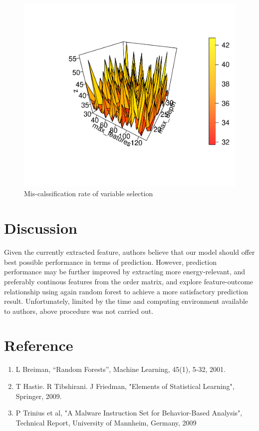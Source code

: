 \documentclass[11pt]{article}
\theoremstyle{definition}
\begin{document}
\begin{figure}[!h]
    \centering
    \includegraphics[width=\textwidth]{"./plots/select"}
    \caption{Mis-calssification rate of variable selection}
    \label{fig:par_select}
\end{figure}

\newpage
\section{\textbf{Discussion}}

Given the currently extracted feature, authors believe that our model should offer best possible performance in terms of prediction. However, prediction performance may be further improved by extracting more energy-relevant, and preferably continous features from the order matrix, and explore feature-outcome relationship  using again random forest to achieve a more satisfactory prediction result. Unfortunately, limited by the time and computing environment available to authors, above procedure was not carried out.


\vspace{2em}
\section*{\textbf{Reference}}
\begin{enumerate}
\item L Breiman, “Random Forests”, Machine Learning, 45(1), 5-32, 2001. 
\item T Hastie. R Tibshirani. J Friedman, "Elements of Statistical Learning", Springer, 2009.
\item P Trinius et al, "A Malware Instruction Set for Behavior-Based Analysis", Technical Report, University of Mannheim, Germany, 2009
\end{enumerate}
\end{document}

